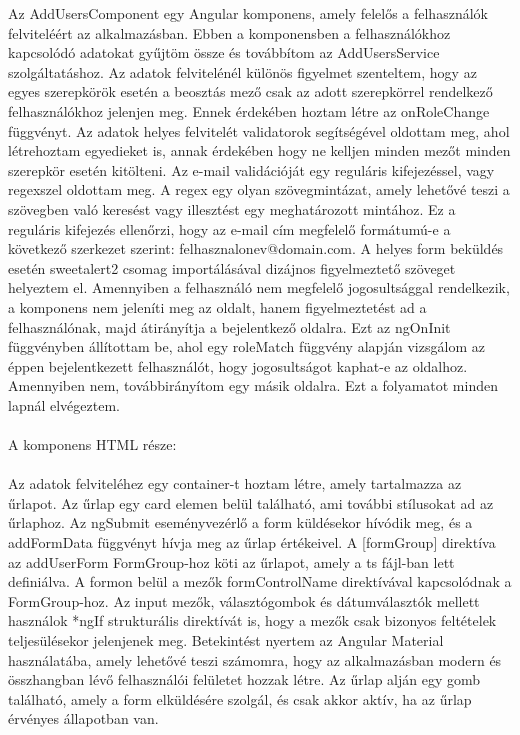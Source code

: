 Az AddUsersComponent egy Angular komponens, amely felelős a felhasználók felviteléért az alkalmazásban. Ebben a komponensben a felhasználókhoz kapcsolódó adatokat gyűjtöm össze és továbbítom az AddUsersService szolgáltatáshoz. Az adatok felvitelénél különös figyelmet szenteltem, hogy az egyes szerepkörök esetén a beosztás mező csak az adott szerepkörrel rendelkező felhasználókhoz jelenjen meg. Ennek érdekében hoztam létre az onRoleChange függvényt. Az adatok helyes felvitelét validatorok segítségével oldottam meg, ahol létrehoztam egyedieket is, annak érdekében hogy ne kelljen minden mezőt minden szerepkör esetén kitölteni. Az e-mail validációját egy reguláris kifejezéssel, vagy regexszel oldottam meg. A regex egy olyan szövegmintázat, amely lehetővé teszi a szövegben való keresést vagy illesztést egy meghatározott mintához. Ez a reguláris kifejezés ellenőrzi, hogy az e-mail cím megfelelő formátumú-e a következő szerkezet szerint: felhasznalonev@domain.com. A helyes form beküldés esetén sweetalert2 csomag importálásával dizájnos figyelmeztető szöveget helyeztem el. Amennyiben a felhasználó nem megfelelő jogosultsággal rendelkezik, a komponens nem jeleníti meg az oldalt, hanem figyelmeztetést ad a felhasználónak, majd átirányítja a bejelentkező oldalra. Ezt az ngOnInit függvényben állítottam be, ahol egy roleMatch függvény alapján vizsgálom az éppen bejelentkezett felhasználót, hogy jogosultságot kaphat-e az oldalhoz. Amennyiben nem, továbbirányítom egy másik oldalra. Ezt a folyamatot minden lapnál elvégeztem.\\
\\A komponens HTML része:\\
\\
Az adatok felviteléhez egy container-t hoztam létre, amely tartalmazza az űrlapot. Az űrlap egy card elemen belül található, ami további stílusokat ad az űrlaphoz. Az ngSubmit eseményvezérlő a form küldésekor hívódik meg, és a addFormData függvényt hívja meg az űrlap értékeivel. A [formGroup] direktíva az addUserForm FormGroup-hoz köti az űrlapot, amely a ts fájl-ban lett definiálva. A formon belül a mezők formControlName direktívával kapcsolódnak a FormGroup-hoz. Az input mezők, választógombok és dátumválasztók mellett használok *ngIf strukturális direktívát is, hogy a mezők csak bizonyos feltételek teljesülésekor jelenjenek meg. Betekintést nyertem az Angular Material használatába, amely lehetővé teszi számomra, hogy az alkalmazásban modern és összhangban lévő felhasználói felületet hozzak létre. Az űrlap alján egy gomb található, amely a form elküldésére szolgál, és csak akkor aktív, ha az űrlap érvényes állapotban van. 

